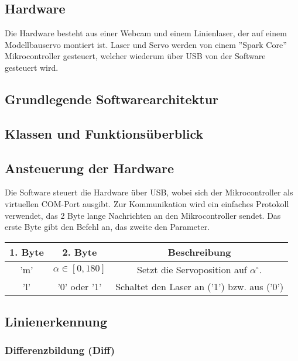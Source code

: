 \documentclass[ngerman,a4paper]{scrartcl}
\begin{document}
\subsection{Hardware}

Die Hardware besteht aus einer Webcam und einem Linienlaser, der auf einem Modellbauservo montiert ist. Laser und Servo werden von einem ''Spark Core'' Mikrocontroller gesteuert, welcher wiederum über USB von der Software gesteuert wird.

\subsection{Grundlegende Softwarearchitektur}

\subsection{Klassen und Funktionsüberblick}

\subsection{Ansteuerung der Hardware}

Die Software steuert die Hardware über USB, wobei sich der Mikrocontroller als virtuellen COM-Port ausgibt. Zur Kommunikation wird ein einfaches Protokoll verwendet, das 2 Byte lange Nachrichten an den Mikrocontroller sendet. Das erste Byte gibt den Befehl an, das zweite den Parameter.\\

\begin{tabular}{|c|c|c|}
\hline
1. Byte & 2. Byte & Beschreibung \\
\hline
'm'\footnotemark & $\alpha \in [0,180]$ & Setzt die Servoposition auf $\alpha ^\circ$.\\
\hline
'l' & '0' oder '1' & Schaltet den Laser an ('1') bzw. aus ('0')\\
\hline
\end{tabular}



\subsection{Linienerkennung}

\subsubsection{Differenzbildung (Diff)}
\end{document}
